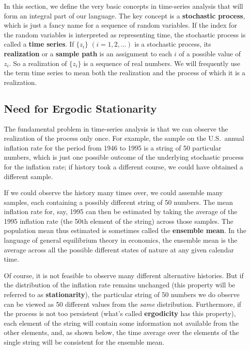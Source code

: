 
In this section, we define the very basic concepts in time-series analysis that will
form an integral part of our language.  The key concept is a \textbf{stochastic process},
which is just a fancy name for a sequence of random variables.  If the index for
the random variables is interpreted as representing time, the stochastic process is
called a \textbf{time series}.  If $\{z_i\}$ $(i = 1, 2, \ldots)$ is a stochastic process,
its \textbf{realization} or a \textbf{sample path} is an assignment to each $i$ of a
possible value of $z_i$.  So a realization of $\{z_i\}$ is a sequence of real numbers.
We will frequently use the term time series to mean both the realization and the
process of which it is a realization.

\subsection*{Need for Ergodic Stationarity}

The fundamental problem in time-series analysis is that we can observe the
realization of the process only once.  For example, the sample on the U.S.\ annual
inflation rate for the period from 1946 to 1995 is a string of 50 particular numbers,
which is just one possible outcome of the underlying stochastic process for the
inflation rate; if history took a different course, we could have obtained a different
sample.

If we could observe the history many times over, we could assemble many samples,
each containing a possibly different string of 50 numbers.  The mean inflation rate
for, say, 1995 can then be estimated by taking the average of the 1995 inflation
rate (the 50th element of the string) across those samples.  The population mean
thus estimated is sometimes called the \textbf{ensemble mean}.  In the language of
general equilibrium theory in economics, the ensemble mean is the average across
all the possible different states of nature at any given calendar time.

Of course, it is not feasible to observe many different alternative histories.  But
if the distribution of the inflation rate remains unchanged (this property will be
referred to as \textbf{stationarity}), the particular string of 50 numbers we do observe
can be viewed as 50 different values from the \emph{same} distribution.  Furthermore,
if the process is not too persistent (what's called \textbf{ergodicity} has this property),
each element of the string will contain some information not available from the
other elements, and, as shown below, the time average over the elements of the
single string will be consistent for the ensemble mean.

